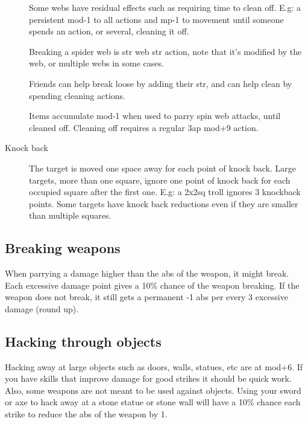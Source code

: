 \begin{description}
Some webs have residual effects such as requiring time to clean off. E.g: a persistent mod-1 to all actions and mp-1 to movement until someone spends an action, or several, cleaning it off.

Breaking a spider web is str \vs web str action, note that it's modified by the web, or multiple webs in some cases.

Friends can help break loose by adding their str, and can help clean by spending cleaning actions.

Items accumulate mod-1 when used to parry spin web attacks, until cleaned off. Cleaning off requires a regular 3ap mod+9 action.


\item[Knock back]
The target is moved one space away for each point of knock back. Large targets, more than one square, ignore one point of knock back for each occupied square after the first one. E.g: a 2x2sq troll ignores 3 knockback points.
Some targets have knock back reductions even if they are smaller than multiple squares.



\end{description}









\subsection*{Breaking weapons}
When parrying a damage higher than the abs of the weapon, it might break.
Each excessive damage point gives a 10\% chance of the weapon breaking.
If the weapon does not break, it still gets a permanent -1 abs per every 3 excessive damage (round up).


\subsection*{Hacking through objects}
Hacking away at large objects such as doors, walls, statues, etc are at mod+6. If you have skills that improve damage for good strikes it should be quick work.
Also, some weapons are not meant to be used against objects. Using your sword or axe to hack away at a stone statue or stone wall will have a 10\% chance each strike to reduce the abs of the weapon by 1.

